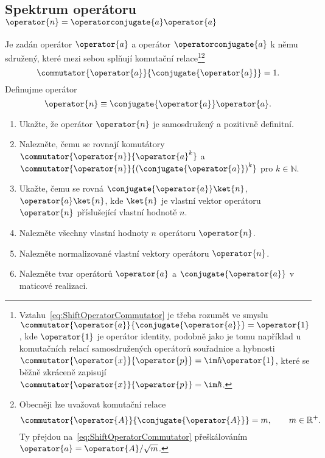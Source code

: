 \subsection[Vlastnosti posunovacích operátorů]{Spektrum operátoru $\operator{n}=\operatorconjugate{a}\operator{a}$}\label{sec:ShiftOperators}
Je zadán operátor $\operator{a}$ a operátor $\operatorconjugate{a}$ k němu sdružený, které mezi sebou splňují komutační relace\footnote{
    Vztahu~\eqref{eq:ShiftOperatorCommutator} je třeba rozumět ve smyslu $\commutator{\operator{a}}{\conjugate{\operator{a}}}=\operator{1}$, kde $\operator{1}$ je operátor identity, podobně jako je tomu například u komutačních relací samosdružených operátorů souřadnice a hybnosti $\commutator{\operator{x}}{\operator{p}}=\im\hbar\operator{1}$, které se běžně zkráceně zapisují $\commutator{\operator{x}}{\operator{p}}=\im\hbar$.
}\footnote{
    Obecněji lze uvažovat komutační relace
    \begin{equation}
        \commutator{\operator{A}}{\conjugate{\operator{A}}}
            =m,\qquad 
        m\in\mathbb{R}^{+}.
    \end{equation}
    Ty přejdou na~\eqref{eq:ShiftOperatorCommutator} přeškálováním $\operator{a}=\operator{A}/\sqrt{m}$.		
}
\begin{equation}
    \commutator{\operator{a}}{\conjugate{\operator{a}}}
        =1.
    \label{eq:ShiftOperatorCommutator}
\end{equation}
Definujme operátor 
\begin{equation}
    \operator{n}
        \equiv\conjugate{\operator{a}}\operator{a}.
    \label{eq:NumberOperator}
\end{equation}

\begin{enumerate}
\item 
    Ukažte, že operátor $\operator{n}$ je samosdružený a pozitivně definitní.

\item
    Nalezněte, čemu se rovnají komutátory $\commutator{\operator{n}}{\operator{a}^{k}}$ a $\commutator{\operator{n}}{\left(\conjugate{\operator{a}}\right)^{k}}$ pro $k\in{\mathbb N}$.

\item
    Ukažte, čemu se rovná $\conjugate{\operator{a}}\ket{n}$, $\operator{a}\ket{n}$, kde $\ket{n}$ je vlastní vektor operátoru $\operator{n}$ příslušející vlastní hodnotě $n$.

\item
    Nalezněte všechny vlastní hodnoty $n$ operátoru $\operator{n}$.
    
\item 
    Nalezněte normalizované vlastní vektory operátoru $\operator{n}$.
    
\item 
    Nalezněte tvar operátorů $\operator{a}$ a $\conjugate{\operator{a}}$ v maticové realizaci.
\end{enumerate}

